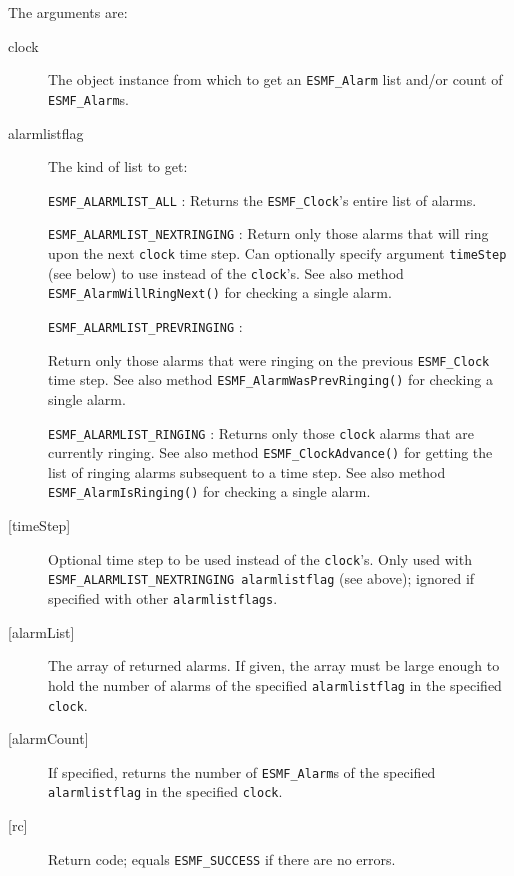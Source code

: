        The arguments are:
       \begin{description}
       \item[clock]
            The object instance from which to get an {\tt ESMF\_Alarm} list
            and/or count of {\tt ESMF\_Alarm}s.
       \item[alarmlistflag]
            The kind of list to get:
  
              {\tt ESMF\_ALARMLIST\_ALL} :
                  Returns the {\tt ESMF\_Clock}'s entire list of alarms.
  
              {\tt ESMF\_ALARMLIST\_NEXTRINGING} :
                  Return only those alarms that will ring upon the next
                  {\tt clock} time step.  Can optionally specify argument
                  {\tt timeStep} (see below) to use instead of the {\tt clock}'s.
                  See also method {\tt ESMF\_AlarmWillRingNext()} for checking a
                  single alarm.
  
              {\tt ESMF\_ALARMLIST\_PREVRINGING} :
                  \begin{sloppypar}
                  Return only those alarms that were ringing on the previous
                  {\tt ESMF\_Clock} time step.  See also method
                  {\tt ESMF\_AlarmWasPrevRinging()} for checking a single alarm.
                  \end{sloppypar}
  
              {\tt ESMF\_ALARMLIST\_RINGING} :
                  Returns only those {\tt clock} alarms that are currently
                  ringing.  See also method {\tt ESMF\_ClockAdvance()} for
                  getting the list of ringing alarms subsequent to a time step.
                  See also method {\tt ESMF\_AlarmIsRinging()} for checking a
                  single alarm.
       \item[{[timeStep]}]
            \begin{sloppypar}
            Optional time step to be used instead of the {\tt clock}'s.
            Only used with {\tt ESMF\_ALARMLIST\_NEXTRINGING alarmlistflag}
            (see above); ignored if specified with other {\tt alarmlistflags}.
            \end{sloppypar}
       \item[{[alarmList]}]
            The array of returned alarms.  If given, the array must be large
            enough to hold the number of alarms of the specified
            {\tt alarmlistflag} in the specified {\tt clock}.
       \item[{[alarmCount]}]
            If specified, returns the number of {\tt ESMF\_Alarm}s of the
            specified {\tt alarmlistflag} in the specified {\tt clock}.
       \item[{[rc]}]
            Return code; equals {\tt ESMF\_SUCCESS} if there are no errors.
       \end{description}
   
